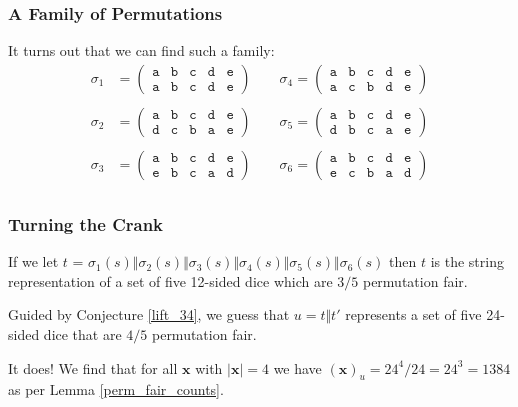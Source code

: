 \documentclass[aspectratio=169]{beamer}
\begin{document}
\begin{frame}[triangle=siiblue]
\frametitle{A Family of Permutations}
It turns out that we can find such a family:
\vfill
\begin{align*}
	\sigma_1 &= \begin{pmatrix}
		\texttt{a} & \texttt{b} & \texttt{c} & \texttt{d} & \texttt{e} \\
		\texttt{a} & \texttt{b} & \texttt{c} & \texttt{d} & \texttt{e}
		\end{pmatrix}
	\qquad
	\sigma_4 = \begin{pmatrix}
		\texttt{a} & \texttt{b} & \texttt{c} & \texttt{d} & \texttt{e} \\
		\texttt{a} & \texttt{c} & \texttt{b} & \texttt{d} & \texttt{e}
		\end{pmatrix} \\ \\
	\sigma_2 &= \begin{pmatrix}
		\texttt{a} & \texttt{b} & \texttt{c} & \texttt{d} & \texttt{e} \\
		\texttt{d} & \texttt{c} & \texttt{b} & \texttt{a} & \texttt{e}
		\end{pmatrix}
	\qquad
	\sigma_5 = \begin{pmatrix}
		\texttt{a} & \texttt{b} & \texttt{c} & \texttt{d} & \texttt{e} \\
		\texttt{d} & \texttt{b} & \texttt{c} & \texttt{a} & \texttt{e}
		\end{pmatrix} \\ \\
	\sigma_3 &= \begin{pmatrix}
		\texttt{a} & \texttt{b} & \texttt{c} & \texttt{d} & \texttt{e} \\
		\texttt{e} & \texttt{b} & \texttt{c} & \texttt{a} & \texttt{d}
		\end{pmatrix}
	\qquad
	\sigma_6 = \begin{pmatrix}
		\texttt{a} & \texttt{b} & \texttt{c} & \texttt{d} & \texttt{e} \\
		\texttt{e} & \texttt{c} & \texttt{b} & \texttt{a} & \texttt{d}
		\end{pmatrix} \\
\end{align*}
\end{frame}

\begin{frame}[triangle=siiblue]
\frametitle{Turning the Crank}
If we let $t$ = $\sigma_1(s) \Vert \sigma_2(s) \Vert \sigma_3(s) \Vert \sigma_4(s) \Vert \sigma_5(s) \Vert \sigma_6(s)$ then $t$ is the string representation of a set of five 12-sided dice which are $3/5$ permutation fair. 

\vfill

Guided by Conjecture \ref{lift_34}, we guess that $u = t \Vert t'$ represents a set of five 24-sided dice that are $4/5$ permutation fair.

\vfill

It does!  We find that for all $\mathbf{x}$ with $|\mathbf{x}| = 4$ we have $(\mathbf{x})_u = 24^4 / 24 = 24^3 = 1384$ as per Lemma \ref{perm_fair_counts}.
\end{frame}
\end{document}
